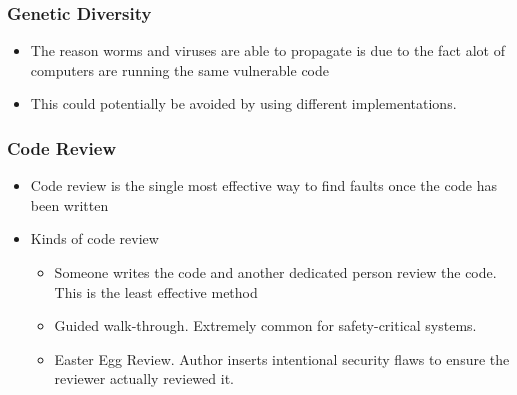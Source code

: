 \documentclass[twoside]{article}
\begin{document}
\subsubsection{Genetic Diversity}
\begin{itemize}
\item The reason worms and viruses are able to propagate is due to the fact alot of computers are running the same vulnerable code 
\item This could potentially be avoided by using different implementations. 
\end{itemize}
\subsubsection{Code Review}
\begin{itemize}
\item Code review is the single most effective way to find faults once the code has been written
\item Kinds of code review
\begin{itemize}
\item Someone writes the code and another dedicated person review the code. This is the least effective method
\item Guided walk-through. Extremely common for safety-critical systems.
\item Easter Egg Review. Author inserts intentional security flaws to ensure the reviewer actually reviewed it. 
\end{itemize}
\end{itemize}
\end{document}

